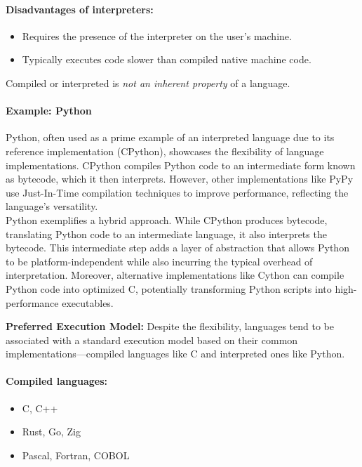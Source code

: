 \documentclass[12pt]{article}
\begin{document}
\paragraph{Disadvantages of interpreters:}
\begin{itemize}
    \item Requires the presence of the interpreter on the user's machine.
    \item Typically executes code slower than compiled native machine code.
\end{itemize}

Compiled or interpreted is \textit{not an inherent property} of a language.

\paragraph{Example: Python}
Python, often used as a prime example of an interpreted language due to its reference implementation (CPython), showcases the flexibility of language implementations. CPython compiles Python code to an intermediate form known as bytecode, which it then interprets. However, other implementations like PyPy use Just-In-Time compilation techniques to improve performance, reflecting the language's versatility.\\
Python exemplifies a hybrid approach. While CPython produces bytecode, translating Python code to an intermediate language, it also interprets the bytecode. This intermediate step adds a layer of abstraction that allows Python to be platform-independent while also incurring the typical overhead of interpretation. Moreover, alternative implementations like Cython can compile Python code into optimized C, potentially transforming Python scripts into high-performance executables.

\textbf{Preferred Execution Model:}
Despite the flexibility, languages tend to be associated with a standard execution model based on their common implementations—compiled languages like C and interpreted ones like Python.





\paragraph{Compiled languages:}
\begin{itemize}
  \item C, C++
  \item Rust, Go, Zig
  \item Pascal, Fortran, COBOL
\end{itemize}
\end{document}
